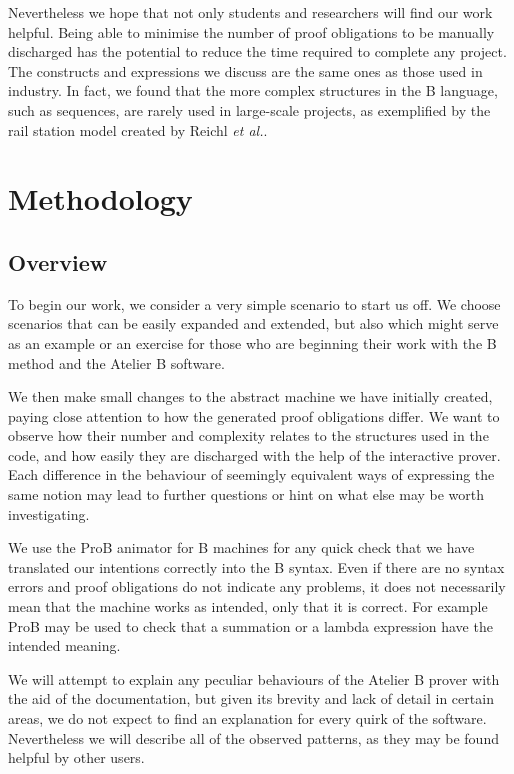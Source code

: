 \documentclass[11pt,journal]{IEEEtran}
\begin{document}
	Nevertheless we hope that not only students and researchers will find our work helpful. Being able to minimise the number of proof obligations to be manually discharged has the potential to reduce the time required to complete any project. The constructs and expressions we discuss are the same ones as those used in industry. In fact, we found that the more complex structures in the B language, such as sequences, are rarely used in large-scale projects, as exemplified by the rail station model created by Reichl \textit{et al.}\cite{station model}.


	\section{Methodology}
	\subsection{Overview}
	To begin our work, we consider a very simple scenario to start us off. We choose scenarios that can be easily expanded and extended, but also which might serve as an example or an exercise for those who are beginning their work with the B method and the Atelier B software.
	
	We then make small changes to the abstract machine we have initially created, paying close attention to how the generated proof obligations differ. We want to observe how their number and complexity relates to the structures used in the code, and how easily they are discharged with the help of the interactive prover. Each difference in the behaviour of seemingly equivalent ways of expressing the same notion may lead to further questions or hint on what else may be worth investigating.
	
	We use the ProB animator for B machines for any quick check that we have translated our intentions correctly into the B syntax. Even if there are no syntax errors and proof obligations do not indicate any problems, it does not necessarily mean that the machine works as intended, only that it is correct. For example ProB may be used to check that a summation or a lambda expression have the intended meaning.
	
	We will attempt to explain any peculiar behaviours of the Atelier B prover with the aid of the documentation, but given its brevity and lack of detail in certain areas, we do not expect to find an explanation for every quirk of the software. Nevertheless we will describe all of the observed patterns, as they may be found helpful by other users.
	
\end{document}
